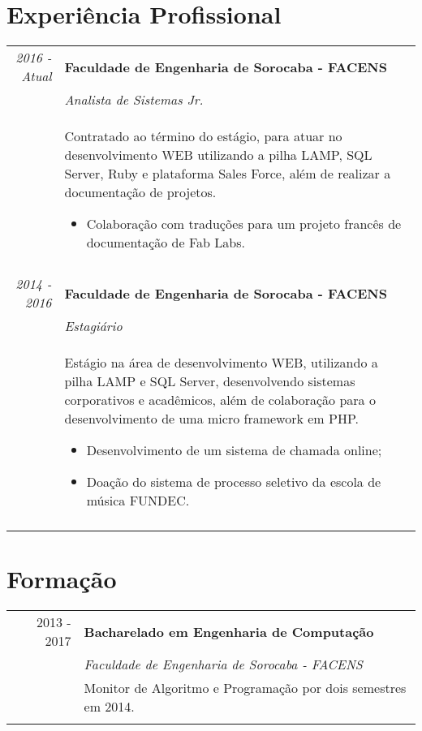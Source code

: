 \documentclass[a4paper,10pt]{article}
\begin{document}
\section{Experiência Profissional}
\begin{tabular}{r|p{11cm}}
 \emph{2016 - Atual} & \textbf{Faculdade de Engenharia de Sorocaba - FACENS} \\
 & \emph{\textit{Analista de Sistemas Jr.}} \\
 & \footnotesize{Contratado ao término do estágio, para atuar no desenvolvimento WEB utilizando a pilha LAMP, SQL Server, Ruby e plataforma Sales Force, além de realizar a documentação de projetos. 
 \begin{itemize}
 	\item Colaboração com traduções para um projeto francês de documentação de Fab Labs.
 \end{itemize} } \\ \multicolumn{2}{c}{} \\
 \emph{2014 - 2016} & \textbf{Faculdade de Engenharia de Sorocaba - FACENS} \\
 & \emph{\textit{Estagiário}} \\
 & \footnotesize{Estágio na área de desenvolvimento WEB, utilizando a pilha LAMP e SQL Server, desenvolvendo sistemas corporativos e acadêmicos, além de colaboração para o desenvolvimento de uma micro framework em PHP.
  \begin{itemize}
 	\item Desenvolvimento de um sistema de chamada online;
 	\item Doação do sistema de processo seletivo da escola de música FUNDEC.
 \end{itemize}} \\ \multicolumn{2}{c}{} \\
\end{tabular}

\section{Formação}
\begin{tabular}{rl}	
 2013 - 2017 & \textbf{Bacharelado em Engenharia de Computação} \\
& \textit{Faculdade de Engenharia de Sorocaba - FACENS} \\
& Monitor de Algoritmo e Programação por dois semestres em 2014.\\&\\
\end{tabular}
\end{document}
